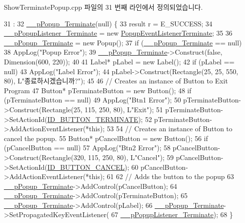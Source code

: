 Show\+Terminate\+Popup.\+cpp 파일의 31 번째 라인에서 정의되었습니다.


\begin{DoxyCode}
31                                        :
32         \hyperlink{class_show_terminate_popup_a60cd94bd39638e83326aff8d48922603}{\_\_pPopup\_Terminate}(null) \{
33     result r = E\_SUCCESS;
34     \hyperlink{class_show_terminate_popup_af444665dbf167ec640964339cf2e3dc1}{\_\_pPopupListener\_Terminate} = \textcolor{keyword}{new} 
      \hyperlink{class_popup_event_listener_terminate}{PopupEventListenerTerminate};
35 
36     \hyperlink{class_show_terminate_popup_a60cd94bd39638e83326aff8d48922603}{\_\_pPopup\_Terminate} = \textcolor{keyword}{new} Popup();
37     \textcolor{keywordflow}{if} (\hyperlink{class_show_terminate_popup_a60cd94bd39638e83326aff8d48922603}{\_\_pPopup\_Terminate} == null)
38         AppLog(\textcolor{stringliteral}{"Popup Error"});
39     \hyperlink{class_show_terminate_popup_a60cd94bd39638e83326aff8d48922603}{\_\_pPopup\_Terminate}->Construct(\textcolor{keyword}{false}, Dimension(600, 220));
40 
41     Label* pLabel = \textcolor{keyword}{new} Label();
42     \textcolor{keywordflow}{if} (pLabel == null)
43         AppLog(\textcolor{stringliteral}{"Label Error"});
44     pLabel->Construct(Rectangle(25, 25, 550, 80), L\textcolor{stringliteral}{"종료하시겠습니까?"});
45 
46     \textcolor{comment}{// Creates an instance of Button to Exit Program}
47     Button* pTerminateButton = \textcolor{keyword}{new} Button();
48     \textcolor{keywordflow}{if} (pTerminateButton == null)
49         AppLog(\textcolor{stringliteral}{"Btn1 Error"});
50     pTerminateButton->Construct(Rectangle(25, 115, 250, 80), L\textcolor{stringliteral}{"Exit"});
51     pTerminateButton->SetActionId(\hyperlink{class_show_terminate_popup_a3d752f28b25045ca82b99204b0162d79}{ID\_BUTTON\_TERMINATE});
52     pTerminateButton->AddActionEventListener(*\textcolor{keyword}{this});
53 
54     \textcolor{comment}{// Creates an instance of Button to cancel the popup.}
55     Button* pCancelButton = \textcolor{keyword}{new} Button();
56     \textcolor{keywordflow}{if} (pCancelButton == null)
57         AppLog(\textcolor{stringliteral}{"Btn2 Error"});
58     pCancelButton->Construct(Rectangle(320, 115, 250, 80), L\textcolor{stringliteral}{"Cancel"});
59     pCancelButton->SetActionId(\hyperlink{class_show_terminate_popup_adc8e53a742deffcc1f19877af899b519}{ID\_BUTTON\_CANCEL});
60     pCancelButton->AddActionEventListener(*\textcolor{keyword}{this});
61 
62     \textcolor{comment}{// Adds the button to the popup}
63     \hyperlink{class_show_terminate_popup_a60cd94bd39638e83326aff8d48922603}{\_\_pPopup\_Terminate}->AddControl(pCancelButton);
64     \hyperlink{class_show_terminate_popup_a60cd94bd39638e83326aff8d48922603}{\_\_pPopup\_Terminate}->AddControl(pTerminateButton);
65     \hyperlink{class_show_terminate_popup_a60cd94bd39638e83326aff8d48922603}{\_\_pPopup\_Terminate}->AddControl(pLabel);
66     \hyperlink{class_show_terminate_popup_a60cd94bd39638e83326aff8d48922603}{\_\_pPopup\_Terminate}->SetPropagatedKeyEventListener(
67             \hyperlink{class_show_terminate_popup_af444665dbf167ec640964339cf2e3dc1}{\_\_pPopupListener\_Terminate});
68 \}
\end{DoxyCode}
